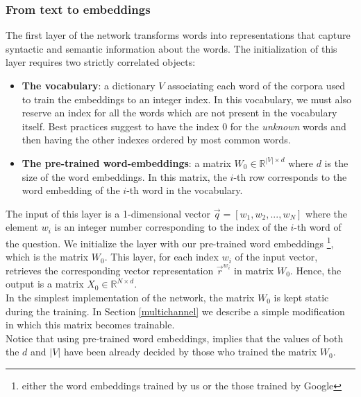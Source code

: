 \documentclass[10pt,twocolumn,letterpaper]{article}
\begin{document}
\subsubsection{From text to embeddings}
The first layer of the network transforms words into representations that capture syntactic and semantic information about the words. The initialization of this layer requires two strictly correlated objects:
\begin{itemize}
\item \textbf{The vocabulary}: a dictionary $V$ associating each word of the corpora used to train the embeddings to an integer index. In this vocabulary, we must also reserve an index for all the words which are not present in the vocabulary itself. Best practices suggest to have the index $0$ for the \emph{unknown} words and then having the other indexes ordered by most common words.
\item \textbf{The pre-trained word-embeddings}: a matrix $W_0 \in \mathbb{R}^{|V| \times d}$ where $d$ is the size of the word embeddings. In this matrix, the $i$-th row corresponds to the word embedding of the $i$-th word in the vocabulary.
\end{itemize}
The input of this layer is a 1-dimensional vector $\vec{q}=[w_1, w_2, ... , w_N]$ where the element $w_i$ is an integer number corresponding to the index of the $i$-th word of the question. We initialize the layer with our pre-trained word embeddings \footnote{either the word embeddings trained by us or the those trained by Google}, which is the matrix $W_0$. This layer, for each index $w_i$ of the input vector, retrieves the corresponding vector representation $\vec{r}^{w_i}$ in matrix $W_0$. Hence, the output is a matrix $X_0 \in \mathbb{R}^{N \times d}$.\\
In the simplest implementation of the network, the matrix $W_0$ is kept static during the training. In Section \ref{multichannel} we describe a simple modification in which this matrix becomes trainable.\\
Notice that using pre-trained word embeddings, implies that the values of both the $d$ and $|V|$ have been already decided by those who trained the matrix $W_0$.
\end{document}
